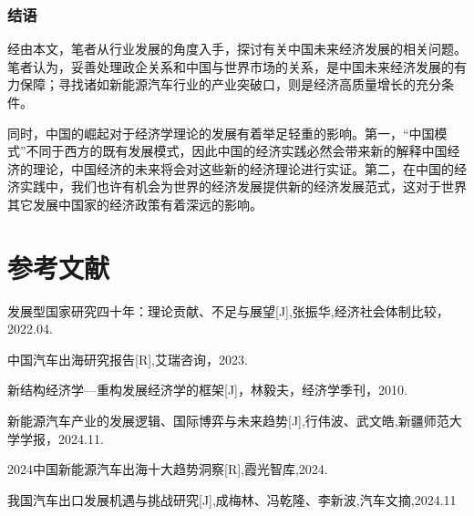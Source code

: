 \documentclass[a4paper, 10pt]{article}
\begin{document}
  \subsubsection{结语}
  经由本文，笔者从行业发展的角度入手，探讨有关中国未来经济发展的相关问题。笔者认为，妥善处理政企关系和中国与世界市场的关系，是中国未来经济发展的有力保障；寻找诸如新能源汽车行业的产业突破口，则是经济高质量增长的充分条件。
  
  同时，中国的崛起对于经济学理论的发展有着举足轻重的影响。第一，“中国模式”不同于西方的既有发展模式，因此中国的经济实践必然会带来新的解释中国经济的理论，中国经济的未来将会对这些新的经济理论进行实证。第二，在中国的经济实践中，我们也许有机会为世界的经济发展提供新的经济发展范式，这对于世界其它发展中国家的经济政策有着深远的影响。




  \section{参考文献}
  \noindent [1]发展型国家研究四十年：理论贡献、不足与展望[J],张振华,经济社会体制比较，2022.04.
 
 \noindent  [2]中国汽车出海研究报告[R],艾瑞咨询，2023.

 \noindent  [3]新结构经济学—重构发展经济学的框架[J]，林毅夫，经济学季刊，2010.

 \noindent  [4]新能源汽车产业的发展逻辑、国际博弈与未来趋势[J],行伟波、武文皓,新疆师范大学学报，2024.11.
  
  \noindent [5]2024中国新能源汽车出海十大趋势洞察[R],霞光智库,2024.

  \noindent [6]我国汽车出口发展机遇与挑战研究[J],成梅林、冯乾隆、李新波,汽车文摘,2024.11
  
  
  
  
  
  
  
  
  
  
  
  
  
  
  
  
\end{document}
